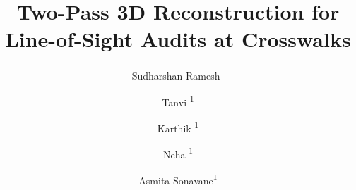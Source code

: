 \documentclass[10pt,twocolumn,letterpaper]{article}
\title{Two-Pass 3D Reconstruction for Line-of-Sight Audits at Crosswalks}
\author{
Sudharshan Ramesh\textsuperscript{1} \and
Tanvi \textsuperscript{1} \and
Karthik \textsuperscript{1} \and
Neha \textsuperscript{1} \and
Asmita Sonavane\textsuperscript{1} \\
}
\begin{document}
\maketitle
    





{
    \small
    
    
}

% 
\end{document}
